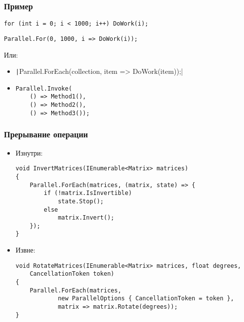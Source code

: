 \documentclass{../../slides-style}
\begin{document}
    \begin{frame}[fragile]
        \frametitle{Пример}
        \begin{verbatim}
for (int i = 0; i < 1000; i++) DoWork(i);
        \end{verbatim}
        \DownArrow
        \begin{verbatim}
Parallel.For(0, 1000, i => DoWork(i));
        \end{verbatim}

        Или:
        \begin{itemize}
            \item \texttt|Parallel.ForEach(collection, item => DoWork(item));|
            \item 
                \begin{verbatim}
Parallel.Invoke(
    () => Method1(),
    () => Method2(),
    () => Method3());
                \end{verbatim}
        \end{itemize}
    \end{frame}

    \begin{frame}[fragile]
        \frametitle{Прерывание операции}
        \begin{itemize}
            \item Изнутри:
            \begin{footnotesize}
                \begin{verbatim}
void InvertMatrices(IEnumerable<Matrix> matrices)
{
    Parallel.ForEach(matrices, (matrix, state) => {
        if (!matrix.IsInvertible)
            state.Stop();
        else
            matrix.Invert();
    });
}
                \end{verbatim}
            \end{footnotesize}

            \item Извне:
            \begin{footnotesize}
                \begin{verbatim}
void RotateMatrices(IEnumerable<Matrix> matrices, float degrees,
    CancellationToken token)
{
    Parallel.ForEach(matrices,
            new ParallelOptions { CancellationToken = token },
            matrix => matrix.Rotate(degrees));
}
                \end{verbatim}
            \end{footnotesize}
        \end{itemize}
    \end{frame}
\end{document}
